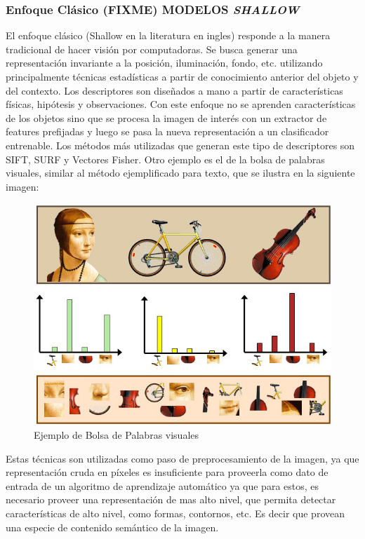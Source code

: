 \documentclass[a4paper,11pt,spanish]{book}
\newcommand*{\FIXME}[1]{{(\textbf{FIXME}) {#1}}}
\begin{document}
      \subsubsection{Enfoque Clásico \FIXME{MODELOS \emph{SHALLOW}}}
	El enfoque clásico (Shallow en la literatura en ingles) responde a la manera tradicional de hacer visión por computadoras. Se busca generar una representación invariante
	a la posición, iluminación, fondo, etc. utilizando principalmente técnicas estadísticas a partir de conocimiento anterior del objeto y del contexto.
	Los descriptores son diseñados a mano a partir de características físicas, hipótesis y observaciones. Con este enfoque no se aprenden características de los objetos sino que
	se procesa la imagen de interés con un extractor de features prefijadas y luego se pasa la nueva representación a un clasificador entrenable.
	Los métodos más utilizadas que generan este tipo de descriptores son SIFT, SURF y Vectores Fisher.
	Otro ejemplo es el de la bolsa de palabras visuales, similar al método ejemplificado para texto, que se ilustra en la siguiente imagen:\\
	\begin{figure}[h]
	  \begin{center}
	    \includegraphics[scale=0.5]{./img/bag_of_visual_words.jpg}
	    \caption{Ejemplo de Bolsa de Palabras visuales}
	  \end{center}
	  \label{fig:bovw}
	\end{figure}

	Estas técnicas son utilizadas como paso de preprocesamiento de la imagen, ya que representación cruda en píxeles es insuficiente para proveerla como dato de entrada de un algoritmo
	de aprendizaje automático ya que para estos, es necesario proveer una representación de mas alto nivel, que permita detectar características de alto nivel,
	como formas, contornos, etc. Es decir que provean una especie de contenido semántico de la imagen.
\end{document}
